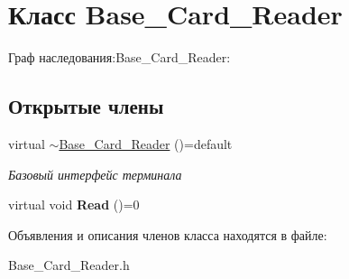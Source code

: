 \hypertarget{classBase__Card__Reader}{}\section{Класс Base\+\_\+\+Card\+\_\+\+Reader}
\label{classBase__Card__Reader}


Граф наследования\+:Base\+\_\+\+Card\+\_\+\+Reader\+:
\subsection*{Открытые члены}
\begin{DoxyCompactItemize}
\item 
virtual \hyperlink{classBase__Card__Reader_a5146a8f61c8f6d117bb248cd0cc7bae3}{$\sim$\+Base\+\_\+\+Card\+\_\+\+Reader} ()=default\hypertarget{classBase__Card__Reader_a5146a8f61c8f6d117bb248cd0cc7bae3}{}\label{classBase__Card__Reader_a5146a8f61c8f6d117bb248cd0cc7bae3}

\begin{DoxyCompactList}\small\item\em Базовый интерфейс терминала \end{DoxyCompactList}\item 
virtual void {\bfseries Read} ()=0\hypertarget{classBase__Card__Reader_a18d6491ffb5aa534d734a46225eb1d68}{}\label{classBase__Card__Reader_a18d6491ffb5aa534d734a46225eb1d68}

\end{DoxyCompactItemize}


Объявления и описания членов класса находятся в файле\+:\begin{DoxyCompactItemize}
\item 
Base\+\_\+\+Card\+\_\+\+Reader.\+h\end{DoxyCompactItemize}
